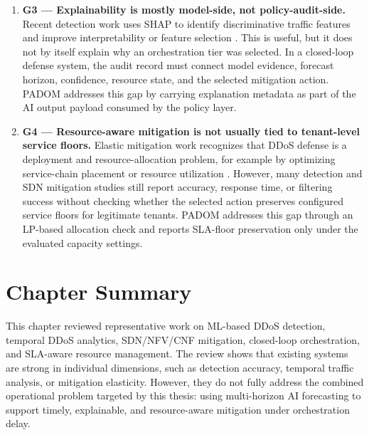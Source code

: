 \documentclass[12pt, a4paper, reqno, oneside]{book}
\newcommand{\padonap}{\textsc{PADOM}}
\begin{document}
\begin{enumerate}
    \item \textbf{G3 --- Explainability is mostly model-side, not
    policy-audit-side.}
    Recent detection work uses SHAP to identify discriminative traffic
    features and improve interpretability or feature selection
    \cite{hernandez2025realtime_timeseries}. This is useful, but it does not
    by itself explain why an orchestration tier was selected. In a closed-loop
    defense system, the audit record must connect model evidence, forecast
    horizon, confidence, resource state, and the selected mitigation action.
    \padonap{} addresses this gap by carrying explanation metadata as part of
    the AI output payload consumed by the policy layer.

    \item \textbf{G4 --- Resource-aware mitigation is not usually tied to
    tenant-level service floors.}
    Elastic mitigation work recognizes that DDoS defense is a deployment and
    resource-allocation problem, for example by optimizing service-chain
    placement or resource utilization \cite{cada_2025}. However, many
    detection and SDN mitigation studies still report accuracy, response time,
    or filtering success without checking whether the selected action preserves
    configured service floors for legitimate tenants. \padonap{} addresses this
    gap through an LP-based allocation check and reports SLA-floor preservation
    only under the evaluated capacity settings.

\end{enumerate}

\section{Chapter Summary}
\label{sec:related-summary}

This chapter reviewed representative work on ML-based DDoS detection,
temporal DDoS analytics, SDN/NFV/CNF mitigation, closed-loop orchestration,
and SLA-aware resource management. The review shows that existing systems are
strong in individual dimensions, such as detection accuracy, temporal traffic
analysis, or mitigation elasticity. However, they do not fully address the
combined operational problem targeted by this thesis: using multi-horizon AI
forecasting to support timely, explainable, and resource-aware mitigation
under orchestration delay.
\end{document}
